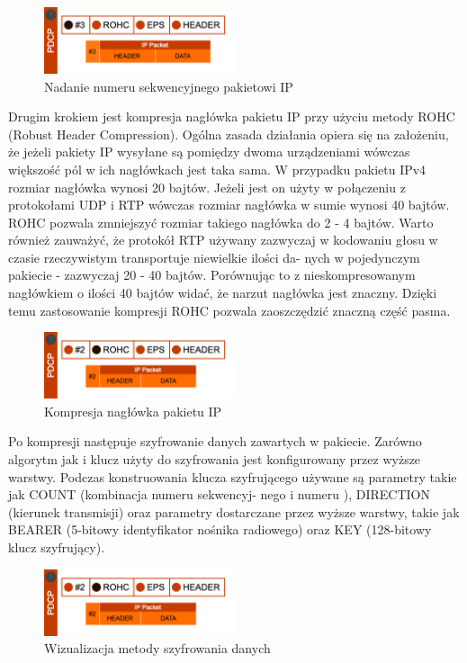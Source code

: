 \begin{figure}
	\centering
		\includegraphics[width=0.5\textwidth]{images/pdcp_1.png}
	\caption{Nadanie numeru sekwencyjnego pakietowi IP}
	\label{fig:pdcp1}
\end{figure}

Drugim krokiem jest kompresja nagłówka pakietu IP przy użyciu metody ROHC (Robust Header Compression). Ogólna zasada działania opiera się na założeniu, że jeżeli pakiety IP wysyłane są pomiędzy dwoma urządzeniami wówczas większość pól w ich nagłówkach jest taka sama. W przypadku pakietu IPv4 rozmiar nagłówka wynosi 20 bajtów. Jeżeli jest on użyty w połączeniu z protokołami UDP i RTP wówczas rozmiar nagłówka w sumie wynosi 40 bajtów. ROHC pozwala zmniejszyć rozmiar takiego nagłówka do 2 - 4 bajtów. Warto również zauważyć, że protokół RTP używany zazwyczaj w kodowaniu głosu w czasie rzeczywistym transportuje niewielkie ilości da- nych w pojedynczym pakiecie - zazwyczaj 20 - 40 bajtów. Porównując to z nieskompresowanym nagłówkiem o ilości 40 bajtów widać, że narzut nagłówka jest znaczny. Dzięki temu zastosowanie kompresji ROHC pozwala zaoszczędzić znaczną część pasma.

\begin{figure}
	\centering
		\includegraphics[width=0.5\textwidth]{images/pdcp_2.png}
	\caption{Kompresja nagłówka pakietu IP}
	\label{fig:pdcp2}
\end{figure}


Po kompresji następuje szyfrowanie danych zawartych w pakiecie. Zarówno algorytm jak i klucz użyty do szyfrowania jest konfigurowany przez wyższe warstwy. Podczas konstruowania klucza szyfrującego używane są parametry takie jak COUNT (kombinacja numeru sekwencyj- nego i numeru ), DIRECTION (kierunek transmisji) oraz parametry dostarczane przez wyższe warstwy, takie jak BEARER (5-bitowy identyfikator nośnika radiowego) oraz KEY (128-bitowy klucz szyfrujący).

\begin{figure}
	\centering
		\includegraphics[width=0.5\textwidth]{images/pdcp_2.png}
	\caption{Wizualizacja metody szyfrowania danych}
	\label{fig:pdcp3}
\end{figure}

